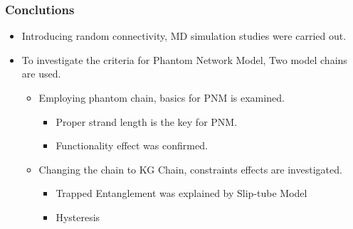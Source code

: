 \documentclass[12pt, dvipdfmx]{beamer}
\begin{document}
\begin{frame}
	\frametitle{Conclutions}

	\begin{itemize}
		\item Introducing random connectivity, MD simulation studies were carried out.
		\item To investigate the criteria for Phantom Network Model, Two model chains are used.
		\begin{itemize}
			\item Employing phantom chain, basics for PNM is examined.
			\begin{itemize}
				\item Proper strand length is the key for PNM.
				\item Functionality effect was confirmed.
			\end{itemize}
			\item Changing the chain to KG Chain, constraints effects are investigated.
			\begin{itemize}
				\item Trapped Entanglement was explained by Slip-tube Model
				\item Hysteresis 
			\end{itemize}
		\end{itemize}
	\end{itemize}


\end{frame}
\end{document}
